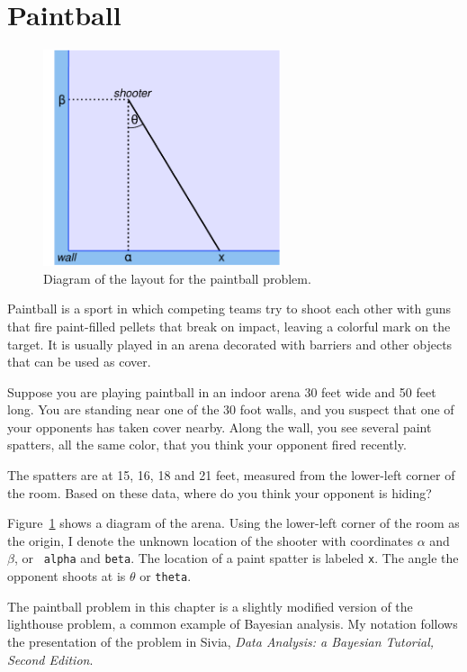 \documentclass[12pt]{book}
\begin{document}
\section{Paintball}

\begin{figure}
\centerline{\includegraphics[height=2.5in]{figs/paintball.pdf}}
\caption{Diagram of the layout for the paintball problem.}
\label{fig.paintball}
\end{figure}

Paintball is a sport in which competing teams try to shoot each other
with guns that fire paint-filled pellets that break on impact, leaving
a colorful mark on the target.  It is usually played in an
arena decorated with barriers and other objects that can be
used as cover.

Suppose you are playing paintball in an indoor arena 30 feet
wide and 50 feet long.  You are standing near one of the 30 foot
walls, and you suspect that one of your opponents has taken cover
nearby.  Along the wall, you see several paint spatters, all the same
color, that you think your opponent fired recently.

The spatters are at 15, 16, 18 and 21 feet, measured from the
lower-left corner of the room.  Based on these data, where do you
think your opponent is hiding?

Figure~\ref{fig.paintball} shows a diagram of the arena.  Using the
lower-left corner of the room as the origin, I denote the unknown
location of the shooter with coordinates $\alpha$ and $\beta$, or {\tt
  alpha} and {\tt beta}.  The location of a paint spatter is labeled
{\tt x}.  The angle the opponent shoots at is $\theta$ or {\tt theta}.

The paintball problem in this chapter is a slightly modified version
of the lighthouse problem, a common example of Bayesian analysis.  My
notation follows the presentation of the problem in Sivia, {\it Data
  Analysis: a Bayesian Tutorial, Second Edition}.
\end{document}
